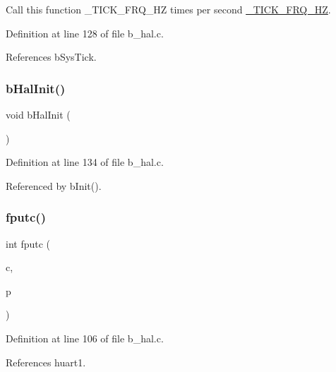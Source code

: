 Call this function \+\_\+\+T\+I\+C\+K\+\_\+\+F\+R\+Q\+\_\+\+HZ times per second \mbox{\hyperlink{b__config_8h_ae2076738df8e2eff78366a0187291367}{\+\_\+\+T\+I\+C\+K\+\_\+\+F\+R\+Q\+\_\+\+HZ}}. 



Definition at line 128 of file b\+\_\+hal.\+c.



References b\+Sys\+Tick.

\mbox{\label{group___h_a_l___exported___functions_ga67c9cec578e4150ae30c526e88e60f97}} 
\subsubsection{\texorpdfstring{b\+Hal\+Init()}{bHalInit()}}
{\footnotesize\ttfamily void b\+Hal\+Init (\begin{DoxyParamCaption}{ }\end{DoxyParamCaption})}



Definition at line 134 of file b\+\_\+hal.\+c.



Referenced by b\+Init().

\mbox{\label{group___h_a_l___exported___functions_gaf709c07e26adbffa5d9984b2cec63c69}} 
\subsubsection{\texorpdfstring{fputc()}{fputc()}}
{\footnotesize\ttfamily int fputc (\begin{DoxyParamCaption}\item[{int}]{c,  }\item[{F\+I\+LE $\ast$}]{p }\end{DoxyParamCaption})}



Definition at line 106 of file b\+\_\+hal.\+c.



References huart1.

